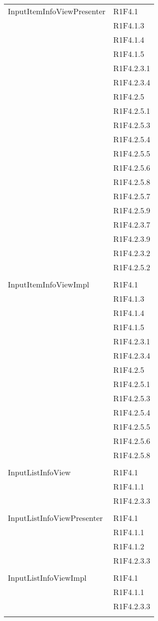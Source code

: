 \begin{center}
\begin{longtable}{|p{7cm}|p{5cm}|}
		InputItemInfoViewPresenter & R1F4.1 \\ & R1F4.1.3 \\ & R1F4.1.4 \\ & R1F4.1.5 \\ & R1F4.2.3.1 \\ & R1F4.2.3.4 \\ & R1F4.2.5 \\ & R1F4.2.5.1 \\ & R1F4.2.5.3 \\ & R1F4.2.5.4 \\ & R1F4.2.5.5 \\ & R1F4.2.5.6 \\ & R1F4.2.5.8 \\ & R1F4.2.5.7 \\ & R1F4.2.5.9 \\ & R1F4.2.3.7 \\ & R1F4.2.3.9 \\ & R1F4.2.3.2 \\ & R1F4.2.5.2 \\ & \\ \hline
		InputItemInfoViewImpl & R1F4.1 \\ & R1F4.1.3 \\ & R1F4.1.4 \\ & R1F4.1.5 \\ & R1F4.2.3.1 \\ & R1F4.2.3.4 \\ & R1F4.2.5 \\ & R1F4.2.5.1 \\ & R1F4.2.5.3 \\ & R1F4.2.5.4 \\ & R1F4.2.5.5 \\ & R1F4.2.5.6 \\ & R1F4.2.5.8 \\ & \\ \hline
		InputListInfoView & R1F4.1 \\ & R1F4.1.1 \\ & R1F4.2.3.3 \\ & \\ \hline
		InputListInfoViewPresenter & R1F4.1 \\ & R1F4.1.1 \\ & R1F4.1.2 \\ & R1F4.2.3.3 \\ & \\ \hline
		InputListInfoViewImpl & R1F4.1 \\ & R1F4.1.1 \\ & R1F4.2.3.3 \\ & \\ \hline

\end{longtable}
\end{center}
